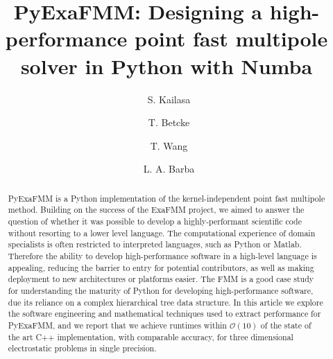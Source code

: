 \documentclass{IEEEcsmag}
\begin{document}

\title{PyExaFMM: Designing a high-performance point fast multipole solver in Python with Numba}

\author{\ S. Kailasa}

\author{\ T. Betcke}

\author{\ T. Wang}

\author{\ L. A. Barba}


\begin{abstract}
PyExaFMM is a Python implementation of the kernel-independent point fast multipole method. Building on the success of the ExaFMM project, we aimed to answer the question of whether it was possible to develop a highly-performant scientific code without resorting to a lower level language. The computational experience of domain specialists is often restricted to interpreted languages, such as Python or Matlab. Therefore the ability to develop high-performance software in a high-level language is appealing, reducing the barrier to entry for potential contributors, as well as making deployment to new architectures or platforms easier. The FMM is a good case study for understanding the maturity of Python for developing high-performance software, due its reliance on a complex hierarchical tree data structure. In this article we explore the software engineering and mathematical techniques used to extract performance for PyExaFMM, and we report that we achieve runtimes within $\mathcal{O}(10)$ of the state of the art C++ implementation, with comparable accuracy, for three dimensional electrostatic problems in single precision.

\end{abstract}

\maketitle
\end{document}
